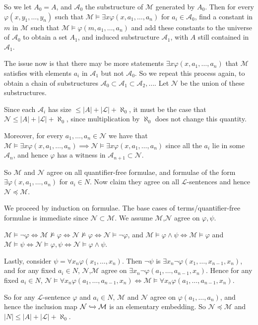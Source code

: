 \documentclass[]{article}
\theoremstyle{custhm}
\theoremstyle{cusdef}
\theoremstyle{custhm}
\theoremstyle{custhm}
\theoremstyle{custhm}
\theoremstyle{custhm}
\theoremstyle{cusdef}
\theoremstyle{remark}
\newcommand{\N}{\mathcal{N}}
\renewcommand{\L}{\mathcal{L}}
\newcommand{\M}{\mathcal{M}}
\renewcommand{\phi}{\varphi}
\newcommand{\A}{\mathcal{A}}
\begin{document}
So we let $A_0 = A$, and $\mathcal{A}_0$ the substructure of $\M$ generated by $A_0$. Then for every $\phi(x,y_1,\dots,y_n)$ such that $\M\models\exists x \phi(x,a_1,\dots,a_n)$ for $a_i \in \A_0$, find a constant in $m$ in $\M$ such that $\M\models \phi(m,a_1,\dots,a_n)$ and add these constants to the universe of $\A_0$ to obtain a set $A_1$, and induced substructure $\A_1$, with $A$ still contained in $\A_1$.

The issue now is that there may be more statements $\exists x \phi(x,a_1,\dots,a_n)$ that $\M$ satisfies with elements $a_i$ in $\A_1$ but not $\A_0$. So we repeat this process again, to obtain a chain of substructures $\A_0\subset\A_1\subset \A_2,\dots$. Let $\N$ be the union of these substructures.

Since each $\A_i$ has size $\le |A| +|\L| + \aleph_0$, it must be the case that $\N \le |A| + |\L| + \aleph_0$, since multiplication by $\aleph_0$ does not change this quantity.

Moreover, for every $a_1,\dots,a_n\in \N$ we have that $\M\models \exists x\phi(x,a_1,\dots,a_n)\implies \N\models \exists x\phi(x,a_1,\dots,a_n)$ since all the $a_i$ lie in some $\A_n$, and hence $\phi$ has a witness in $\A_{n+1}\subset \N$.

So $\M$ and $\N$ agree on all quantifier-free formulae, and formulae of the form $\exists \phi(x,a_1,\dots,a_n)$ for $a_i \in N$. Now claim they agree on all $\L$-sentences and hence $\N\preceq \M$.

We proceed by induction on formulae. The base cases of terms/quantifier-free formulae is immediate since $\N\subset \M$. We assume $\M$,$\N$ agree on $\phi,\psi$.

$\M \models \neg \phi \iff \M \not\models \phi \iff \N\not \models \phi \iff \N\models \neg \phi$, and $\M \models \phi\land \psi\iff \M\models \phi$ and $\M\models \psi \iff \N\models \phi,\psi \iff \N \models \phi\land\psi$.

Lastly, consider $\psi = \forall x_n\phi(x_1,\dots,x_n)$. Then $\neg\psi$ is $\exists x_n\neg\phi(x_1,\dots,x_{n-1},x_n)$, and for any fixed $a_i\in N$, $\N$,$\M$ agree on $\exists x_n\neg\phi(a_1,\dots,a_{n-1},x_n)$. Hence for any fixed $a_i\in N$, $\N\models \forall x_n\phi(a_1,\dots,a_{n-1},x_n)\iff \M\models \forall x_n\phi(a_1,\dots,a_{n-1},x_n)$.

So for any $\L$-sentence $\phi$ and $a_i\in N$, $\M$ and $\N$ agree on $\phi(a_1,\dots,a_n)$, and hence the inclusion map $\N\xhookrightarrow[]{} \M$ is an elementary embedding. So $\N\preceq\M$ and $|N| \le |A| + |\L| + \aleph_0$.
\end{document}
